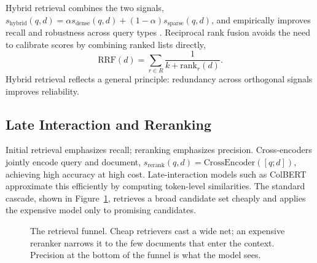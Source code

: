 \documentclass[11pt]{book}
\begin{document}
Hybrid retrieval combines the two signals, $s_{\text{hybrid}}(q,d) = \alpha s_{\text{dense}}(q,d) + (1-\alpha)s_{\text{sparse}}(q,d)$, and empirically improves recall and robustness across query types \cite{hybridrag2025}. Reciprocal rank fusion avoids the need to calibrate scores by combining ranked lists directly,
\[
\text{RRF}(d) = \sum_{r \in R} \frac{1}{k + \text{rank}_r(d)}.
\]
Hybrid retrieval reflects a general principle: redundancy across orthogonal signals improves reliability.

\subsection{Late Interaction and Reranking}

Initial retrieval emphasizes recall; reranking emphasizes precision. Cross-encoders jointly encode query and document, $s_{\text{rerank}}(q,d) = \text{CrossEncoder}([q; d])$, achieving high accuracy at high cost. Late-interaction models such as ColBERT \cite{colbert} approximate this efficiently by computing token-level similarities. The standard cascade, shown in Figure~\ref{fig:retrieval-funnel}, retrieves a broad candidate set cheaply and applies the expensive model only to promising candidates.

\begin{figure}[htbp]
\centering
{}
\caption{The retrieval funnel. Cheap retrievers cast a wide net; an expensive reranker narrows it to the few documents that enter the context. Precision at the bottom of the funnel is what the model sees.}
\label{fig:retrieval-funnel}
\end{figure}
\end{document}
